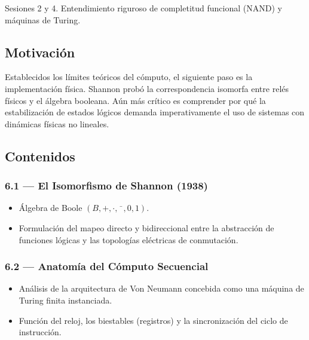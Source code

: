 \documentclass[11pt, letterpaper]{article}
\begin{document}
\begin{prereqs}
Sesiones 2 y 4. Entendimiento riguroso de completitud funcional (NAND) y m\'aquinas de Turing.
\end{prereqs}

\subsection*{Motivaci\'on}
Establecidos los l\'imites te\'oricos del c\'omputo, el siguiente paso es la implementaci\'on f\'isica. Shannon prob\'o la correspondencia isomorfa entre rel\'es f\'isicos y el \'algebra booleana. A\'un m\'as cr\'itico es comprender por qu\'e la estabilizaci\'on de estados l\'ogicos demanda imperativamente el uso de sistemas con din\'amicas f\'isicas no lineales.

\subsection{Contenidos}

\subsubsection{6.1 --- El Isomorfismo de Shannon (1938)}
\begin{itemize}
  \item \'Algebra de Boole $(B,+,\cdot,\bar{\phantom{x}},0,1)$.
  \item Formulaci\'on del mapeo directo y bidireccional entre la abstracci\'on de funciones l\'ogicas y las topolog\'ias el\'ectricas de conmutaci\'on.
\end{itemize}

\subsubsection{6.2 --- Anatom\'ia del C\'omputo Secuencial}
\begin{itemize}
  \item An\'alisis de la arquitectura de Von Neumann concebida como una m\'aquina de Turing finita instanciada.
  \item Funci\'on del reloj, los biestables (registros) y la sincronizaci\'on del ciclo de instrucci\'on.
\end{itemize}
\end{document}
